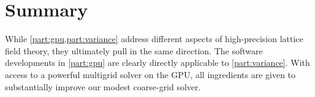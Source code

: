 \chapter{Summary}
\label{ch:summary}





While \cref{part:gpu,part:variance} address different aspects of high-precision lattice field theory, they ultimately pull in the same direction.
The software developments in \cref{part:gpu} are clearly directly applicable to \cref{part:variance}.
With access to a powerful multigrid solver on the GPU, all ingredients are given to substantially improve our modest coarse-grid solver.

